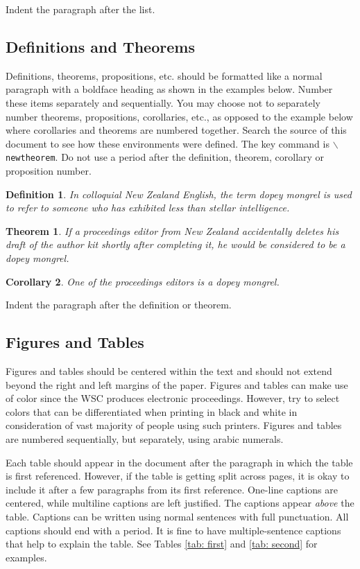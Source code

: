\documentclass{wscpaperproc}
\theoremstyle{wsc}
\newtheorem{theorem}{Theorem}
\newtheorem{corollary}[theorem]{Corollary}
\newtheorem{definition}{Definition}
\begin{document}
Indent the paragraph after the list.


\subsection{Definitions and Theorems}
Definitions, theorems, propositions, etc. should be formatted like a normal paragraph with a boldface heading as shown in the examples below. Number
these items separately and sequentially. You may choose not to separately number theorems, propositions, corollaries, etc., as opposed to the example below where corollaries and theorems are numbered together. Search the source of this document to see how these environments were defined. The key
command is {\tt $\backslash$newtheorem}. Do not use a period after the definition, theorem, corollary or proposition number.

\begin{definition}
In colloquial New Zealand English, the term {\em dopey mongrel} is used to refer to someone who has exhibited less than stellar intelligence.
\end{definition}

\begin{theorem}
If a proceedings editor from New Zealand accidentally deletes his draft of the author kit shortly after completing it, he would be considered to be a dopey mongrel.
\end{theorem}

\begin{corollary}
One of the proceedings editors is a dopey mongrel.
\end{corollary}

Indent the paragraph after the definition or theorem.

\subsection{Figures and Tables}
\label{sec:graphics}
Figures and tables should be centered within the text and should not extend beyond the right and left margins of the paper.
Figures and tables can make use of color since the WSC produces electronic proceedings.
However, try to select colors that can be differentiated when printing in black and white in consideration of vast majority of people using such printers.
Figures and tables are numbered sequentially, but separately, using arabic numerals.

Each table should appear in the document after the paragraph in which the table is first referenced. However, if the table is getting split across pages, it is okay to include it after a few paragraphs from its first reference.
One-line captions are centered, while multiline captions are left justified.
The captions appear {\em above} the table. 
Captions can be written using normal sentences with full punctuation. All captions should end with a period. It is fine to have multiple-sentence captions that help to explain the table. 
See Tables \ref{tab: first} and \ref{tab: second} for examples.
\end{document}
